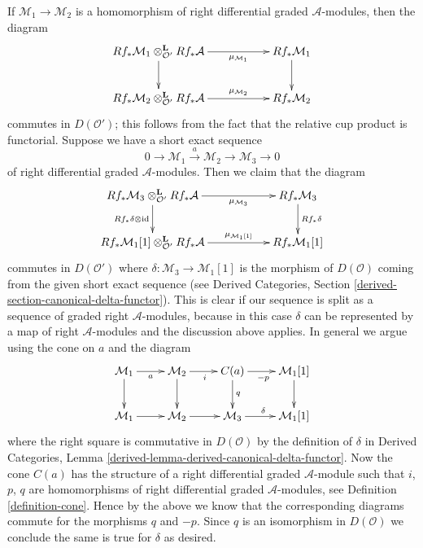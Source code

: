 \documentclass{stacks-project}
\theoremstyle{plain}
\theoremstyle{definition}
\theoremstyle{remark}
\numberwithin{equation}{subsection}
\begin{document}
\medskip\noindent
If $\mathcal{M}_1 \to \mathcal{M}_2$ is a homomorphism of
right differential graded $\mathcal{A}$-modules, then the diagram
$$
\xymatrix{
Rf_*\mathcal{M}_1 \otimes_{\mathcal{O}'}^\mathbf{L} Rf_*\mathcal{A}
\ar[rr]_-{\mu_{\mathcal{M}_1}} \ar[d] & &
Rf_*\mathcal{M}_1 \ar[d] \\
Rf_*\mathcal{M}_2 \otimes_{\mathcal{O}'}^\mathbf{L} Rf_*\mathcal{A}
\ar[rr]^-{\mu_{\mathcal{M}_2}} & &
Rf_*\mathcal{M}_2
}
$$
commutes in $D(\mathcal{O}')$; this follows from the fact that the relative
cup product is functorial. Suppose we have a short exact sequence
$$
0 \to \mathcal{M}_1 \xrightarrow{a} \mathcal{M}_2 \to \mathcal{M}_3 \to 0
$$
of right differential graded $\mathcal{A}$-modules. Then we claim
that the diagram
$$
\xymatrix{
Rf_*\mathcal{M}_3 \otimes_{\mathcal{O}'}^\mathbf{L} Rf_*\mathcal{A}
\ar[rr]_-{\mu_{\mathcal{M}_3}} \ar[d]_{Rf_*\delta \otimes \text{id}} & & 
Rf_*\mathcal{M}_3 \ar[d]^{Rf_*\delta} \\
Rf_*\mathcal{M}_1[1] \otimes_{\mathcal{O}'}^\mathbf{L} Rf_*\mathcal{A}
\ar[rr]^-{\mu_{\mathcal{M}_1[1]}} & &
Rf_*\mathcal{M}_1[1]
}
$$
commutes in $D(\mathcal{O}')$ where
$\delta : \mathcal{M}_3 \to \mathcal{M}_1[1]$ is the
morphism of $D(\mathcal{O})$ coming from the given
short exact sequence (see
Derived Categories, Section \ref{derived-section-canonical-delta-functor}).
This is clear if our sequence is split as a sequence of graded right
$\mathcal{A}$-modules, because in this case $\delta$ can be represented
by a map of right $\mathcal{A}$-modules and the discussion above applies.
In general we argue using the cone on $a$ and the diagram
$$
\xymatrix{
\mathcal{M}_1 \ar[r]_a \ar[d] &
\mathcal{M}_2 \ar[r]_i \ar[d] &
C(a) \ar[r]_{-p} \ar[d]^q &
\mathcal{M}_1[1] \ar[d] \\
\mathcal{M}_1 \ar[r] &
\mathcal{M}_2 \ar[r] &
\mathcal{M}_3 \ar[r]^\delta &
\mathcal{M}_1[1]
}
$$
where the right square is commutative in $D(\mathcal{O})$ by the definition of
$\delta$ in Derived Categories, Lemma
\ref{derived-lemma-derived-canonical-delta-functor}.
Now the cone $C(a)$ has the structure of a right differential graded
$\mathcal{A}$-module such that $i$, $p$, $q$ are homomorphisms of
right differential graded $\mathcal{A}$-modules, see
Definition \ref{definition-cone}.
Hence by the above we know that the corresponding
diagrams commute for the morphisms $q$ and $-p$.
Since $q$ is an isomorphism in $D(\mathcal{O})$ we conclude the
same is true for $\delta$ as desired.
\end{document}
